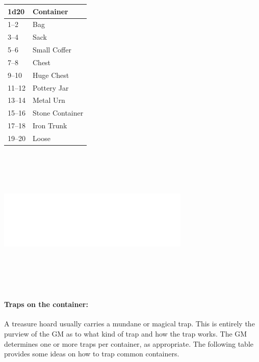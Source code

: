 \begin{multicols}{2}
\begin{minipage}{\columnwidth}
\label{treasurecontainer}
\noindent
\begin{tabular}{|p{}|p{}|}
\hline
1d20	& Container \\
\hline\hline
\rowcolor[gray]{.9}1--2	& Bag \\
3--4	& Sack \\
\rowcolor[gray]{.9}5--6	& Small Coffer \\
7--8	& Chest \\
\rowcolor[gray]{.9}9--10	& Huge Chest \\
11--12	& Pottery Jar \\
\rowcolor[gray]{.9}13--14	& Metal Urn \\
15--16	& Stone Container \\
\rowcolor[gray]{.9}17--18	& Iron Trunk \\
19--20	& Loose \\
\hline
\end{tabular}

\end{minipage}

\noindent\includegraphics[width=3.6in, height=2.75in]{testblock.pdf}

\paragraph{Traps on the container:} A treasure hoard usually carries a mundane or magical trap.  This is entirely the purview of the GM as to what kind of trap and how the trap works.  The GM determines one or more traps per container, as appropriate.  The following table provides some ideas on how to trap common containers.

\noindent
\begin{minipage}{\columnwidth}


\end{minipage}
\end{multicols}
